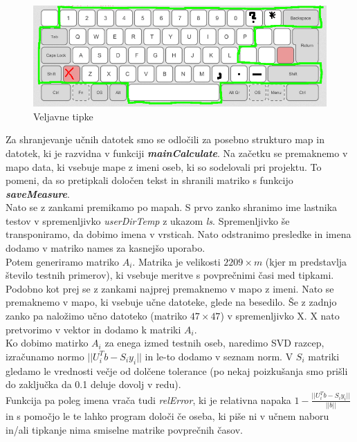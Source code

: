 \documentclass[12pt]{article}
\begin{document}
\begin{figure}[h]
  \centering
  \label{slika1}
  \includegraphics[scale=1.5]{keyboard}
  \caption{Veljavne tipke}
\end{figure}

\pagebreak
Za shranjevanje učnih datotek smo se odločili za posebno strukturo map in datotek, ki je razvidna v funkciji 
\textbf{\textit{mainCalculate}}. Na začetku se premaknemo v mapo data, ki vsebuje mape z imeni oseb, 
ki so sodelovali pri projektu. To pomeni, da so pretipkali določen tekst in shranili matriko s funkcijo 
\textbf{\textit{saveMeasure}}.\\
\newline
Nato se z zankami premikamo po mapah. S prvo zanko shranimo ime lastnika testov v spremenljivko \textit{userDirTemp} 
z ukazom \textit{ls}. Spremenljivko še transponiramo, da dobimo imena v vrsticah. Nato odstranimo presledke in imena 
dodamo v matriko names za kasnejšo uporabo.\\
\newline
Potem generiramo matriko $A_i$. Matrika je velikosti $2209 \times m$ (kjer m predstavlja število testnih primerov), ki 
vsebuje meritve s povprečnimi časi med tipkami.\\
\newline
Podobno kot prej se z zankami najprej premaknemo v mapo z imeni. Nato se premaknemo v mapo, ki vsebuje učne datoteke, 
glede na besedilo. Še z zadnjo zanko pa naložimo učno datoteko (matriko $47\times 47$) v spremenljivko X. X nato pretvorimo 
v vektor in dodamo k matriki $A_i$. \\
\newline
Ko dobimo matirko $A_i$ za enega izmed testnih oseb, naredimo SVD razcep, izračunamo normo $||U_i^Tb-S_iy_i||$ 
in le-to dodamo v seznam norm. V $S_i$ matriki gledamo le vrednosti večje od dolčene tolerance (po nekaj poizkušanja smo
prišli do zaključka da 0.1 deluje dovolj v redu). \\
\newline
Funkcija pa poleg imena vrača tudi \textit{relError}, ki je relativna napaka $1-\frac{||U_i^Tb-S_iy_i||}{||b||}$ 
in s pomočjo le te lahko program določi če oseba, ki piše ni v
učnem naboru in/ali tipkanje nima smiselne matrike povprečnih časov.
\end{document}
